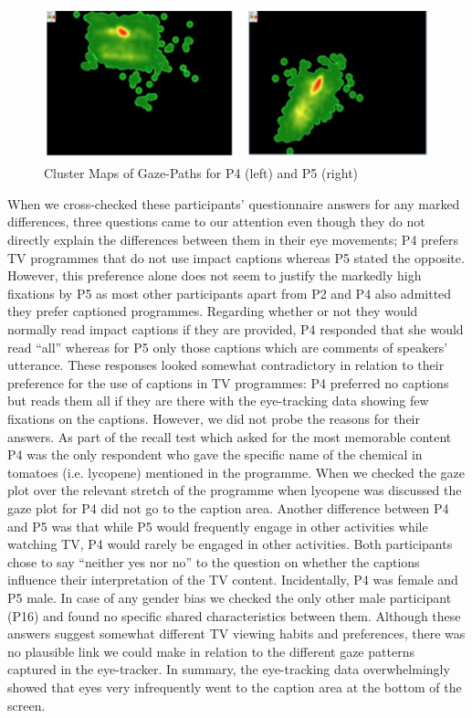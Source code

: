 \documentclass[output=paper]{langsci/langscibook}
\begin{document}
  
\begin{figure}[t]
 \includegraphics[width=\textwidth]{figures/OHagan6.png}
 \caption{Cluster Maps of Gaze-Paths for P4 (left) and P5 (right)}
\label{ohagan:fig:7}
\end{figure}


When we cross-checked these participants' questionnaire answers for any marked differences, three questions came to our attention even though they do not directly explain the differences between them in their eye movements; P4 prefers TV programmes that do not use impact captions whereas P5 stated the opposite. However, this preference alone does not seem to justify the markedly high fixations by P5 as most other participants apart from P2 and P4 also admitted they prefer captioned programmes. Regarding whether or not they would normally read impact captions if they are provided, P4 responded that she would read ``all'' whereas for P5 only those captions which are comments of speakers' utterance. These responses looked somewhat contradictory in relation to their preference for the use of captions in TV programmes: P4 preferred no captions but reads them all if they are there with the eye-tracking data showing few fixations on the captions. However, we did not probe the reasons for their answers. As part of the recall test which asked for the most memorable content P4 was the only respondent who gave the specific name of the chemical in tomatoes (i.e. lycopene) mentioned in the programme. When we checked the gaze plot over the relevant stretch of the programme when lycopene was discussed the gaze plot for P4 did not go to the caption area. Another difference between P4 and P5 was that while P5 would frequently engage in other activities while watching TV, P4 would rarely be engaged in other activities. Both participants chose to say ``neither yes nor no'' to the question on whether the captions influence their interpretation of the TV content. Incidentally, P4 was female and P5 male. In case of any gender bias we checked the only other male participant (P16) and found no specific shared characteristics between them. Although these answers suggest somewhat different TV viewing habits and preferences, there was no plausible link we could make in relation to the different gaze patterns captured in the eye-tracker.  In summary, the eye-tracking data overwhelmingly showed that eyes very infrequently went to the caption area at the bottom of the screen. 
\end{document}
